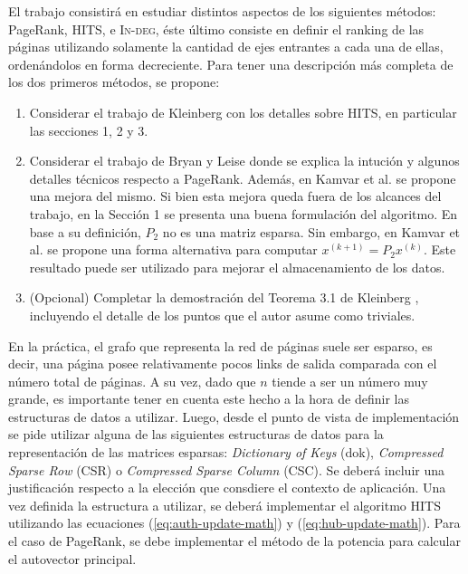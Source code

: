 El trabajo consistir\'a en estudiar distintos aspectos de los siguientes m\'etodos: PageRank, HITS, e \textsc{In-deg}, \'este \'ultimo consiste
en definir el ranking de las p\'aginas utilizando solamente la cantidad de ejes entrantes a cada una de ellas, orden\'andolos en forma
decreciente. Para tener una descripci\'on m\'as completa de los dos primeros m\'etodos, se propone:
\begin{enumerate}
\item Considerar el trabajo de Kleinberg \cite{Kleinberg} con los detalles sobre HITS, en particular las secciones 1, 2 y 3.
\item Considerar el trabajo de Bryan y Leise \cite{Bryan2006} donde se explica la intuci\'on y algunos detalles t\'ecnicos respecto a PageRank. Adem\'as, 
en Kamvar et al. \cite{Kamvar2003} se propone una mejora del mismo. Si bien esta mejora queda fuera de los alcances del trabajo, en la Secci\'on 1 se
presenta una buena formulaci\'on del algoritmo. En base a su definici\'on, $P_2$ no es una matriz esparsa. Sin embargo, en Kamvar et al. 
\cite[Algoritmo 1]{Kamvar2003} se propone una forma alternativa para computar $x^{(k+1)} = P_2 x^{(k)}$. Este resultado puede ser utilizado
para mejorar el almacenamiento de los datos.
\item (Opcional) Completar la demostraci\'on del Teorema 3.1 de Kleinberg \cite{Kleinberg}, incluyendo el detalle de los puntos que el autor asume como 
triviales.
\end{enumerate}

En la pr\'actica, el grafo que representa la red de p\'aginas suele ser esparso, es decir, una p\'agina posee relativamente pocos links
de salida comparada con el n\'umero total de p\'aginas. A su vez, dado que $n$ tiende a ser un n\'umero muy grande, es importante tener
en cuenta este hecho a la hora de definir las estructuras de datos a utilizar. Luego, desde el punto de vista de implementaci\'on se pide
utilizar alguna de las siguientes estructuras de datos para la representaci\'on de las matrices esparsas: \emph{Dictionary of Keys} (dok), 
\emph{Compressed Sparse Row} (CSR) o \emph{Compressed Sparse Column} (CSC). Se deber\'a incluir una justificaci\'on respecto a la elecci\'on 
que consdiere el contexto de aplicaci\'on. Una vez definida la estructura a utilizar, se deber\'a implementar el algoritmo HITS utilizando
las ecuaciones (\ref{eq:auth-update-math}) y (\ref{eq:hub-update-math}). Para el caso de PageRank, se debe implementar el m\'etodo de la
potencia para calcular el autovector principal.

